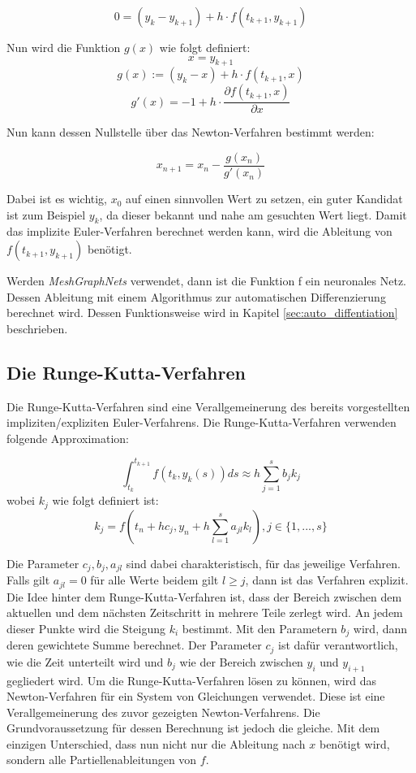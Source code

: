 $$
0 = (y_k - y_{k + 1})  + h \cdot f(t_{k + 1}, y_{k + 1})
$$

Nun wird die Funktion $g(x)$ wie folgt definiert:
$$
x = y_{k + 1}
$$
$$
g(x) := (y_k - x)  + h \cdot f(t_{k + 1}, x)
$$
$$
g'(x) = -1 + h \cdot \frac{\partial f(t_{k+1}, x)}{\partial x}
$$

Nun kann dessen Nullstelle über das Newton-Verfahren bestimmt werden:

$$
x_{n+1} = x_{n} - \frac{g(x_n)}{g'(x_n)}
$$

Dabei ist es wichtig, $x_{0}$ auf einen sinnvollen Wert zu setzen, ein guter Kandidat ist zum Beispiel
$y_{k}$, da dieser bekannt und nahe am gesuchten Wert liegt.
Damit das implizite Euler-Verfahren berechnet werden kann, wird die Ableitung von $f(t_{k + 1}, y_{k + 1})$ benötigt.

Werden \textit{MeshGraphNets} verwendet,
dann ist die Funktion f ein neuronales Netz.
Dessen Ableitung mit einem Algorithmus zur automatischen Differenzierung berechnet wird.
Dessen Funktionsweise wird in Kapitel \ref{sec:auto_diffentiation} beschrieben.

\subsection{Die Runge-Kutta-Verfahren} \label{sec:runge_kutta}

Die Runge-Kutta-Verfahren \cite[Kapitel~II.1]{ode1} sind eine Verallgemeinerung des
bereits vorgestellten impliziten/expliziten Euler-Verfahrens.
Die Runge-Kutta-Verfahren verwenden folgende Approximation:

$$
\int_{t_k}^{t_{k+1}} f(t_k, y_k(s)) ds \approx h \sum_{j=1}^{s} b_j k_j
$$
wobei $k_j$ wie folgt definiert ist:
$$
k_j = f(t_n + h c_j, y_n + h \sum_{l=1}^{s}a_{jl}k_{l}) , j \in \{1, ..., s\}
$$

Die Parameter $c_j, b_j, a_{jl}$ sind dabei charakteristisch,
für das jeweilige Verfahren.
Falls gilt $a_{jl} = 0$ für alle Werte beidem gilt $l \ge j$, dann ist das Verfahren explizit.
Die Idee hinter dem Runge-Kutta-Verfahren ist, dass der Bereich zwischen dem aktuellen und dem nächsten Zeitschritt in mehrere Teile zerlegt wird.  
An jedem dieser Punkte wird die Steigung $k_i$ bestimmt.
Mit den Parametern $b_j$ wird, dann deren gewichtete Summe berechnet.
Der Parameter $c_j$ ist dafür verantwortlich, wie die Zeit unterteilt wird und $b_j$ wie der Bereich zwischen $y_i$ und $y_{i+1}$ gegliedert wird.
Um die Runge-Kutta-Verfahren lösen zu können, wird das Newton-Verfahren für ein 
System von Gleichungen verwendet.
Diese ist eine Verallgemeinerung des zuvor gezeigten Newton-Verfahrens.
Die Grundvoraussetzung für dessen Berechnung ist jedoch die gleiche.
Mit dem einzigen Unterschied, dass nun nicht nur die Ableitung nach $x$ benötigt wird, sondern alle Partiellenableitungen von $f$.

